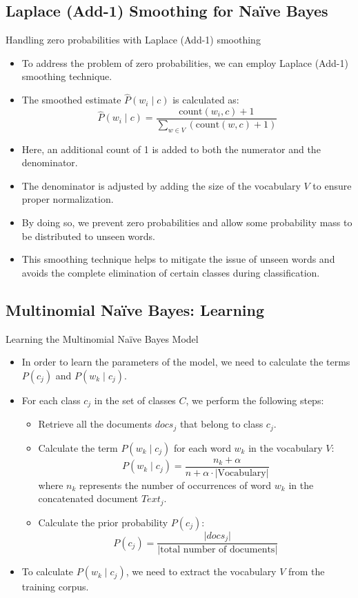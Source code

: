 \subsection{Laplace (Add-1) Smoothing for Naïve Bayes}
Handling zero probabilities with Laplace (Add-1) smoothing
\begin{itemize}
    \item To address the problem of zero probabilities, we can employ Laplace (Add-1) smoothing technique.
    \item The smoothed estimate $\hat{P}(w_i \mid c)$ is calculated as:
    \[
    \hat{P}(w_i \mid c) = \frac{\text{count}(w_i, c) + 1}{\sum_{w \in V} (\text{count}(w, c) + 1)}
    \]
    \item Here, an additional count of 1 is added to both the numerator and the denominator.
    \item The denominator is adjusted by adding the size of the vocabulary $V$ to ensure proper normalization.
    \item By doing so, we prevent zero probabilities and allow some probability mass to be distributed to unseen words.
    \item This smoothing technique helps to mitigate the issue of unseen words and avoids the complete elimination of certain classes during classification.
\end{itemize}






\subsection{Multinomial Naïve Bayes: Learning}
Learning the Multinomial Naïve Bayes Model
\begin{itemize}
    \item In order to learn the parameters of the model, we need to calculate the terms $P(c_j)$ and $P(w_k \mid c_j)$.
    \item For each class $c_j$ in the set of classes $C$, we perform the following steps:
    \begin{itemize}
        \item Retrieve all the documents $docs_j$ that belong to class $c_j$.
        \item Calculate the term $P(w_k \mid c_j)$ for each word $w_k$ in the vocabulary $V$:
        \[
        P(w_k \mid c_j) = \frac{{n_k + \alpha}}{{n + \alpha \cdot \lvert \text{Vocabulary} \rvert}}
        \]
        where $n_k$ represents the number of occurrences of word $w_k$ in the concatenated document $Text_j$.
        \item Calculate the prior probability $P(c_j)$:
        \[
        P(c_j) = \frac{{\lvert docs_j \rvert}}{{\lvert \text{total number of documents} \rvert}}
        \]
    \end{itemize}
    \item To calculate $P(w_k \mid c_j)$, we need to extract the vocabulary $V$ from the training corpus.
\end{itemize}


